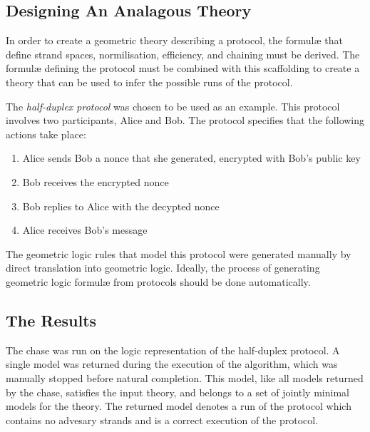 	\subsection{Designing An Analagous Theory}

		In order to create a geometric theory describing a protocol, the
		formul{\ae} that define strand spaces, normilisation, efficiency, and
		chaining must be derived. The formul{\ae} defining the protocol must be
		combined with this scaffolding to create a theory that can be used to
		infer the possible runs of the protocol.

		The \emph{half-duplex protocol} was chosen to be used as an example.
		This protocol involves two participants, Alice and Bob. The protocol
		specifies that the following actions take place:

		\begin{enumerate}
		\item Alice sends Bob a nonce that she generated, encrypted with Bob's public key
		\item Bob receives the encrypted nonce
		\item Bob replies to Alice with the decypted nonce
		\item Alice receives Bob's message
		\end{enumerate}

		The geometric logic rules that model this protocol were generated
		manually by direct translation into geometric logic. Ideally, the
		process of generating geometric logic formul{\ae} from protocols should
		be done automatically.

	\subsection{The Results}

		The chase was run on the logic representation of the half-duplex protocol.
		A single model was returned during the execution of the algorithm,
		which was manually stopped before natural completion. This model, like
		all models returned by the chase, satisfies the input theory, and
		belongs to a set of jointly minimal models for the theory. The returned
		model denotes a run of the protocol which contains no advesary strands
		and is a correct execution of the protocol.
